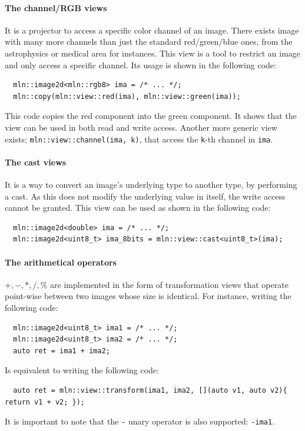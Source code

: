 \paragraph{The channel/RGB views} It is a projector to access a specific color channel of an image. There exists image
with many more channels than just the standard red/green/blue ones, from the astrophysics or medical area for instances.
This view is a tool to restrict an image and only access a specific channel. Its usage is shown in the following code:
\begin{verbatim}
  mln::image2d<mln::rgb8> ima = /* ... */;
  mln::copy(mln::view::red(ima), mln::view::green(ima));
\end{verbatim}
This code copies the red component into the green component. It shows that the view can be used in both read and write
access. Another more generic view exists; \texttt{mln::view::channel(ima, k)}, that access the \texttt{k}-th
channel in \texttt{ima}.

\paragraph{The cast views} It is a way to convert an image's underlying type to another type, by performing a cast. As
this does not modify the underlying value in itself, the write access cannot be granted. This view can be used as shown
in
the following code:
\begin{verbatim}
  mln::image2d<double> ima = /* ... */;
  mln::image2d<uint8_t> ima_8bits = mln::view::cast<uint8_t>(ima);
\end{verbatim}

\paragraph{The arithmetical operators} \(+, -, *, /, \%\) are implemented in the form of transformation views that
operate point-wise between two images whose size is identical. For instance, writing the following code:
\begin{verbatim}
  mln::image2d<uint8_t> ima1 = /* ... */;
  mln::image2d<uint8_t> ima2 = /* ... */;
  auto ret = ima1 + ima2;
\end{verbatim}
Is equivalent to writing the following code:
\begin{verbatim}
  auto ret = mln::view::transform(ima1, ima2, [](auto v1, auto v2){ return v1 + v2; });
\end{verbatim}
It is important to note that the \texttt{-} unary operator is also supported: \texttt{-ima1}.

